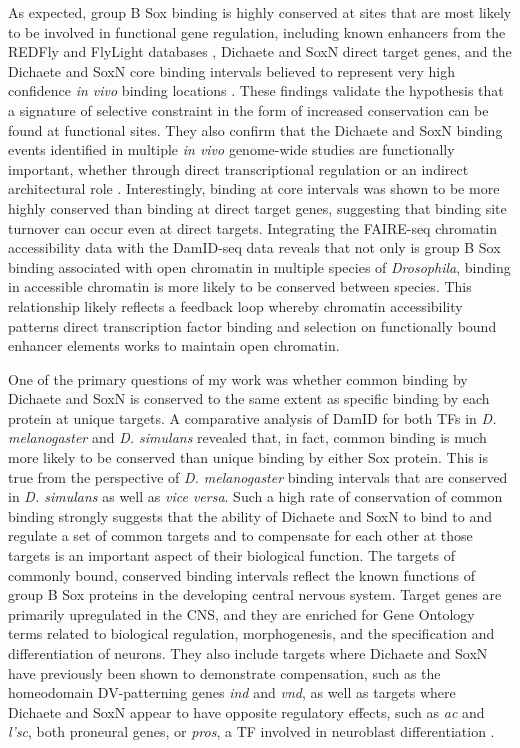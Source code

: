 As expected, group B Sox binding is highly conserved at sites that are most likely to be involved in functional gene regulation, including known enhancers from the REDFly and FlyLight databases \citep{gallo_redfly_2010,manning_resource_2012}, Dichaete and SoxN direct target genes, and the Dichaete and SoxN core binding intervals believed to represent very high confidence \emph{in vivo} binding locations \citep{aleksic_role_2013,ferrero_soxneuro_2014}. These findings validate the hypothesis that a signature of selective constraint in the form of increased conservation can be found at functional sites. They also confirm that the Dichaete and SoxN binding events identified in multiple \emph{in vivo} genome-wide studies are functionally important, whether through direct transcriptional regulation or an indirect architectural role \citep{russell_dichaete_1996}. Interestingly, binding at core intervals was shown to be more highly conserved than binding at direct target genes, suggesting that binding site turnover can occur even at direct targets. Integrating the FAIRE-seq chromatin accessibility data with the DamID-seq data reveals that not only is group B Sox binding associated with open chromatin in multiple species of \emph{Drosophila}, binding in accessible chromatin is more likely to be conserved between species. This relationship likely reflects a feedback loop whereby chromatin accessibility patterns direct transcription factor binding and selection on functionally bound enhancer elements works to maintain open chromatin.

One of the primary questions of my work was whether common binding by Dichaete and SoxN is conserved to the same extent as specific binding by each protein at unique targets. A comparative analysis of DamID for both TFs in \emph{D. melanogaster} and \emph{D. simulans} revealed that, in fact, common binding is much more likely to be conserved than unique binding by either Sox protein. This is true from the perspective of \emph{D. melanogaster} binding intervals that are conserved in \emph{D. simulans} as well as \emph{vice versa}. Such a high rate of conservation of common binding strongly suggests that the ability of Dichaete and SoxN to bind to and regulate a set of common targets and to compensate for each other at those targets is an important aspect of their biological function. The targets of commonly bound, conserved binding intervals reflect the known functions of group B Sox proteins in the developing central nervous system. Target genes are primarily upregulated in the CNS, and they are enriched for Gene Ontology terms related to biological regulation, morphogenesis, and the specification and differentiation of neurons. They also include targets where Dichaete and SoxN have previously been shown to demonstrate compensation, such as the homeodomain DV-patterning genes \emph{ind} and \emph{vnd}, as well as targets where Dichaete and SoxN appear to have opposite regulatory effects, such as \emph{ac} and \emph{l'sc}, both proneural genes, or \emph{pros}, a TF involved in neuroblast differentiation \citep{aleksic_role_2013,ferrero_soxneuro_2014,overton_evidence_2002}.


